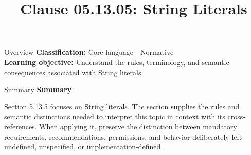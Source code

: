 \documentclass[10pt,letterpaper]{article}
\title{Clause 05.13.05: String Literals}
\author{}
\date{}
\begin{document}
\maketitle
\begin{CornellOverviewBox}{Overview}
\textbf{Classification:} Core language - Normative\\[2pt]
\textbf{Learning objective:} Understand the rules, terminology, and semantic consequences associated with String literals.
\end{CornellOverviewBox}\begin{CornellSummaryBox}{Summary}
{\sffamily\bfseries\color{Accent} Summary}\par\vspace{3pt}Section 5.13.5 focuses on String literals. The section supplies the rules and semantic distinctions needed to interpret this topic in context with its cross-references. When applying it, preserve the distinction between mandatory requirements, recommendations, permissions, and behavior deliberately left undefined, unspecified, or implementation-defined.
\end{CornellSummaryBox}
\end{document}
